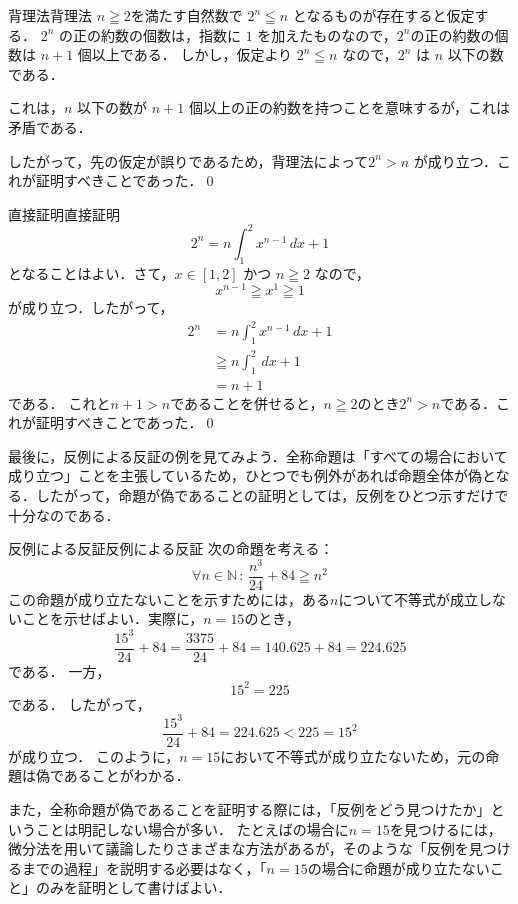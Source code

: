 \begin{example}{背理法}{背理法}
  $n \geqq 2$を満たす自然数で $2^n \leqq n$ となるものが存在すると仮定する．
  $2^n$ の正の約数の個数は，指数に $1$ を加えたものなので，$2^n$の正の約数の個数は $n + 1$ 個以上である．
  しかし，仮定より $2^n \leqq n$ なので，$2^n$ は $n$ 以下の数である．

  これは，$n$ 以下の数が $n + 1$ 個以上の正の約数を持つことを意味するが，これは矛盾である．

  したがって，先の仮定が誤りであるため，背理法によって$2^n > n$ が成り立つ．これが証明すべきことであった．\qed
\end{example}

\begin{example}{直接証明}{直接証明}
  \[
    2^n = n \int_{1}^{2} x^{n-1} \, dx + 1
  \]
  となることはよい．さて，$x \in [1, 2]$ かつ $n \geqq 2$ なので，
  \[
    x^{n-1} \geqq x^{1} \geqq 1
  \]
  が成り立つ．したがって，
  \begin{align*}
    2^n & = n \int_{1}^{2} x^{n-1} \, dx + 1 \\
        & \geqq  n \int_{1}^{2} \, dx +1     \\
        & = n+1
  \end{align*}
  である．
  これと$n+1 >n$であることを併せると，$n \geqq 2$のとき$2^n > n$である．これが証明すべきことであった．\qed
\end{example}

最後に，反例による反証の例を見てみよう．全称命題は「すべての場合において成り立つ」ことを主張しているため，ひとつでも例外があれば命題全体が偽となる．したがって，命題が偽であることの証明としては，反例をひとつ示すだけで十分なのである．

\begin{example}{反例による反証}{反例による反証}
  次の命題を考える：
  \[
    \forall n \in \mathbb{N}\, : \, \frac{n^3}{24} + 84 \geqq n^2
  \]
  この命題が成り立たないことを示すためには，ある$n$について不等式が成立しないことを示せばよい．実際に，$n = 15$のとき，
  \[
    \frac{15^3}{24} + 84 = \frac{3375}{24} + 84 = 140.625 + 84 = 224.625
  \]
  である．
  一方，
  \[
    15^2 = 225
  \]
  である．
  したがって，
  \[
    \frac{15^3}{24} + 84 = 224.625 < 225 = 15^2
  \]
  が成り立つ．
  このように，$n = 15$において不等式が成り立たないため，元の命題は偽であることがわかる．
\end{example}

また，全称命題が偽であることを証明する際には，「反例をどう見つけたか」ということは明記しない場合が多い．
たとえばの場合に$n=15$を見つけるには，微分法を用いて議論したりさまざまな方法があるが，そのような「反例を見つけるまでの過程」を説明する必要はなく，「$n=15$の場合に命題が成り立たないこと」のみを証明として書けばよい．